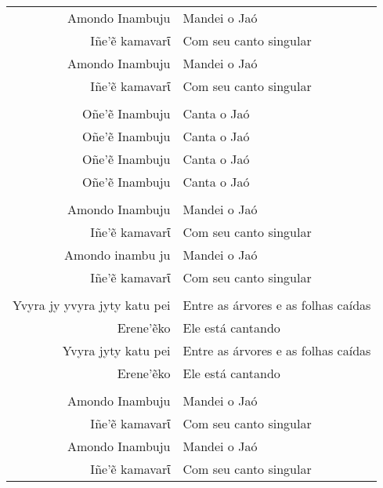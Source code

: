 \begin{table}[]
\begin{tabular}{rl}
Amondo Inambuju          & Mandei o Jaó           \\
Iñe'ẽ kamavarῖ\footnotemark{}          & Com seu canto singular           \\
Amondo Inambuju  		& Mandei o Jaó \\
Iñe'ẽ kamavarῖ          & Com seu canto singular           \\
                  &                     \\
Oñe'ẽ Inambuju\footnotemark{}          & Canta o Jaó           \\
Oñe'ẽ Inambuju          & Canta o Jaó           \\
Oñe'ẽ Inambuju  		& Canta o Jaó \\
Oñe'ẽ Inambuju          & Canta o Jaó           \\
                  &                     \\
Amondo Inambuju          & Mandei o Jaó           \\
Iñe'ẽ kamavarῖ          & Com seu canto singular           \\
Amondo inambu ju  		& Mandei o Jaó \\
Iñe'ẽ kamavarῖ          & Com seu canto singular           \\
                  &                     \\
Yvyra jy yvyra jyty katu pei          & Entre as árvores e as folhas caídas           \\
Erene'ẽko          & Ele está cantando           \\
Yvyra jyty katu pei  		& Entre as árvores e as folhas caídas \\
Erene'ẽko          & Ele está cantando           \\
                  &                     \\
Amondo Inambuju          & Mandei o Jaó           \\
Iñe'ẽ kamavarῖ          & Com seu canto singular           \\
Amondo Inambuju  		& Mandei o Jaó \\
Iñe'ẽ kamavarῖ          & Com seu canto singular           \\
\end{tabular}
\end{table}




